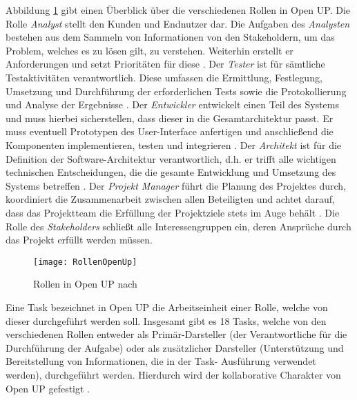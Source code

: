Abbildung \ref{fig:RollenOpenUp} gibt einen Überblick über die verschiedenen Rollen in Open UP. Die Rolle \textit{Analyst} stellt den Kunden und Endnutzer dar. Die Aufgaben des \textit{Analysten} bestehen aus dem Sammeln von Informationen von den Stakeholdern, um das Problem, welches es zu lösen gilt, zu verstehen. Weiterhin erstellt er Anforderungen und setzt Prioritäten für diese \cite{OpenUPProcess}.\newline
Der \textit{Tester} ist für sämtliche Testaktivitäten verantwortlich. Diese umfassen die Ermittlung, Festlegung, Umsetzung und Durchführung der erforderlichen Tests sowie die Protokollierung und Analyse der Ergebnisse \cite{OpenUPProcess}.
Der \textit{Entwickler} entwickelt einen Teil des Systems und muss hierbei sicherstellen, dass dieser in die Gesamtarchitektur passt. Er muss eventuell Prototypen des User-Interface anfertigen und anschließend die Komponenten implementieren, testen und integrieren \cite{OpenUPProcess}.\newline
Der \textit{Architekt} ist für die Definition der Software-Architektur verantwortlich, d.h. er trifft alle wichtigen technischen Entscheidungen, die die gesamte Entwicklung und Umsetzung des Systems betreffen \cite{OpenUPProcess}.\newline
Der \textit{Projekt Manager} führt die Planung des Projektes durch, koordiniert die Zusammenarbeit zwischen allen Beteiligten und achtet darauf, dass das Projektteam die Erfüllung der Projektziele stets im Auge behält \cite{OpenUPProcess}.\newline
Die Rolle des \textit{Stakeholders} schließt alle Interessengruppen ein, deren Ansprüche durch das Projekt erfüllt werden müssen. \newline

\begin{figure}[htp]
\begin{center}
  \texttt{[image: RollenOpenUp]} %
  \caption{Rollen in Open UP nach \cite{openup}}
  \label{fig:RollenOpenUp}
\end{center}
\end{figure}

Eine Task bezeichnet in Open UP die Arbeitseinheit einer Rolle, welche von dieser durchgeführt werden soll. Insgesamt gibt es 18 Tasks, welche von den verschiedenen Rollen entweder als Primär-Darsteller (der Verantwortliche für die Durchführung der Aufgabe) oder als zusätzlicher Darsteller (Unterstützung und Bereitstellung von Informationen, die in der Task- Ausführung verwendet werden), durchgeführt werden. Hierdurch wird der kollaborative Charakter von Open UP gefestigt \cite{eclipseopenup}.

